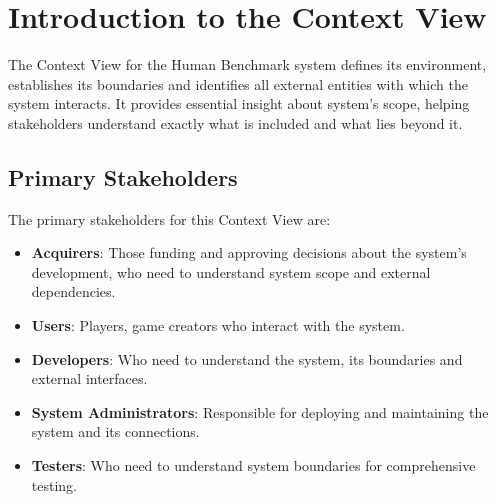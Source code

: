 

% 


\section{Introduction to the Context View}

The Context View for the Human Benchmark system defines
its environment, establishes its boundaries
and identifies all external entities with which the system
interacts. It provides essential insight about system’s scope, 
helping stakeholders understand exactly what is included and what lies beyond it.

\subsection{Primary Stakeholders}

The primary stakeholders for this Context View are:

\begin{itemize}
    \item \textbf{Acquirers}: Those funding and approving decisions about the system's development, who need to understand system scope and external dependencies.
    \item \textbf{Users}: Players, game creators who interact with the system.
    \item \textbf{Developers}: Who need to understand the system, its boundaries and external interfaces.
    \item \textbf{System Administrators}: Responsible for deploying and maintaining the system and its connections.
    \item \textbf{Testers}: Who need to understand system boundaries for comprehensive testing.
\end{itemize}

